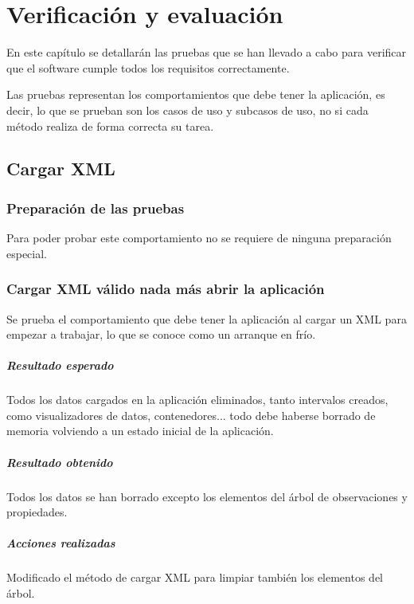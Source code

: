\chapter{Verificaci\'{o}n y evaluaci\'{o}n}
En este cap\'itulo se detallar\'an las pruebas
que se han llevado a cabo para verificar que el software
cumple todos los requisitos correctamente.

Las pruebas representan los comportamientos que debe
tener la aplicaci\'on, es decir, lo que se prueban son los
casos de uso y subcasos de uso, no si cada m\'etodo
realiza de forma correcta su tarea.

\section{Cargar XML}

\subsection{Preparaci\'on de las pruebas}
Para poder probar este comportamiento no se requiere de ninguna preparaci\'on 
especial.

\subsection{Cargar XML v\'alido nada m\'as abrir la aplicaci\'on}
Se prueba el comportamiento que debe tener la aplicaci\'on al cargar
un XML para empezar a trabajar, lo que se conoce como un arranque en fr\'io.

\paragraph{Resultado esperado}
Todos los datos cargados en la aplicaci\'on eliminados, 
tanto intervalos creados, como visualizadores de datos,
contenedores... todo debe haberse borrado de memoria volviendo a un estado inicial
de la aplicaci\'on.

\paragraph{Resultado obtenido}
Todos los datos se han borrado excepto los elementos del \'arbol de observaciones
y propiedades. 

\paragraph{Acciones realizadas}
Modificado el m\'etodo de cargar XML para limpiar tambi\'en los elementos del
\'arbol.

